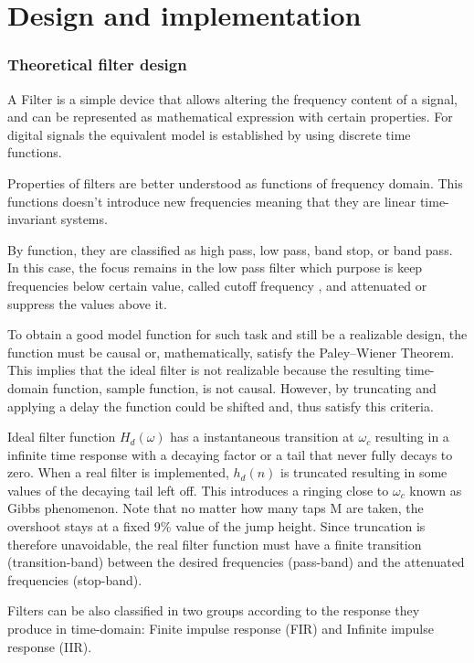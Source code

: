\documentclass[12 pt]{article}
\begin{document}
	\section{Design and implementation}
	
	\subsubsection{Theoretical filter design}
	A Filter is a simple device that allows altering the frequency content of a signal, and can be represented as mathematical expression with certain properties. For digital signals the equivalent model is established by using discrete time functions. 
	
	Properties of filters are better understood as functions of frequency domain. This functions doesn't introduce new frequencies meaning that they are linear time-invariant systems.
	
	 By function, they are classified as high pass, low pass, band stop, or band pass. In this case, the focus remains in the low pass filter which purpose is keep frequencies below certain value, called cutoff frequency , and attenuated or suppress the values above it.   
	
	To obtain a good model function for such task and still be a realizable design, the function must be causal or, mathematically, satisfy the Paley–Wiener Theorem. This implies that the ideal filter is not realizable because the resulting time-domain function, sample function, is not causal. However, by truncating and applying a delay the function could be shifted and, thus satisfy this criteria.
	
	Ideal filter function $H_{d}(\omega)$ has a instantaneous transition at $\omega_c$  resulting in a infinite time response with a decaying factor or a tail that never fully decays to zero. When a real filter is implemented, $h_{d}(n)$ is truncated resulting in some values of the decaying tail left off. This introduces a ringing close to $\omega_c$ known as Gibbs phenomenon. Note that no matter how many taps M are taken, the overshoot stays at a fixed 9\% value of the jump height. Since truncation is therefore unavoidable, the real filter function must have a finite transition (transition-band) between the desired frequencies (pass-band) and the attenuated frequencies (stop-band).
	

	 Filters can be also classified in two groups according to the response they produce in time-domain: Finite impulse response (FIR) and Infinite impulse response (IIR). 
	
\end{document}
